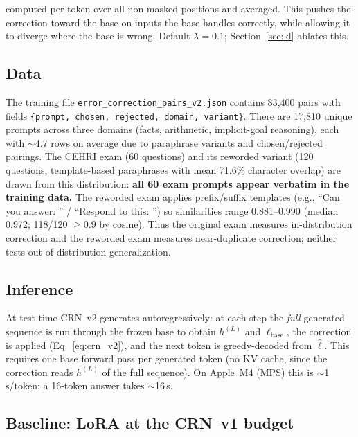\documentclass[11pt]{article}
\begin{document}
computed per-token over all non-masked positions and averaged.
This pushes the correction toward the base on inputs the base handles correctly, while allowing it to diverge where the base is wrong.
Default $\lambda{=}0.1$; Section~\ref{sec:kl} ablates this.

\subsection{Data}
\label{sec:data}

The training file \texttt{error\_correction\_pairs\_v2.json} contains 83{,}400 pairs with fields \texttt{\{prompt, chosen, rejected, domain, variant\}}.
There are 17{,}810 unique prompts across three domains (facts, arithmetic, implicit-goal reasoning), each with $\sim$4.7 rows on average due to paraphrase variants and chosen/rejected pairings.
The CEHRI exam (60 questions) and its reworded variant (120 questions, template-based paraphrases with mean 71.6\% character overlap) are drawn from this distribution: \textbf{all 60 exam prompts appear verbatim in the training data.}
The reworded exam applies prefix/suffix templates (e.g., ``Can you answer: '' / ``Respond to this: '') so similarities range 0.881--0.990 (median 0.972; 118/120 $\ge 0.9$ by cosine).
Thus the original exam measures in-distribution correction and the reworded exam measures near-duplicate correction; neither tests out-of-distribution generalization.

\subsection{Inference}
\label{sec:inference}

At test time CRN~v2 generates autoregressively: at each step the \emph{full} generated sequence is run through the frozen base to obtain $h^{(L)}$ and $\ell_{\text{base}}$, the correction is applied (Eq.~\ref{eq:crn_v2}), and the next token is greedy-decoded from $\hat{\ell}$.
This requires one base forward pass per generated token (no KV cache, since the correction reads $h^{(L)}$ of the full sequence).
On Apple~M4 (MPS) this is $\sim$1\,s/token; a 16-token answer takes $\sim$16\,s.

\subsection{Baseline: LoRA at the CRN~v1 budget}
\label{sec:lora}
\end{document}
